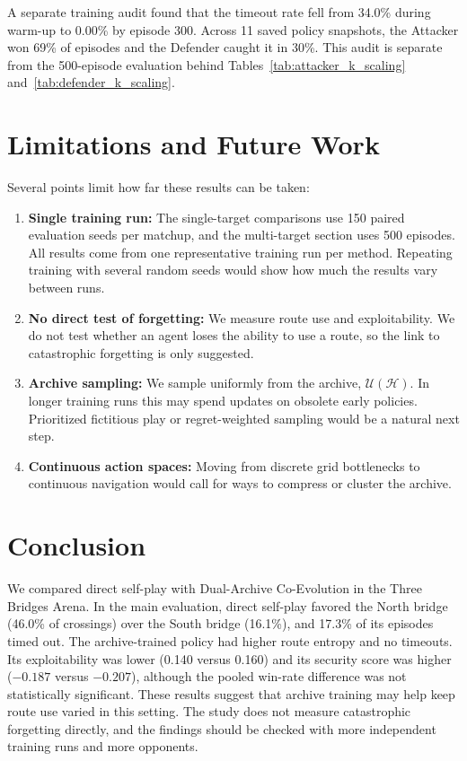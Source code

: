 \documentclass[conference]{IEEEtran}
\begin{document}
A separate training audit found that the timeout rate fell from 34.0\% during warm-up to 0.00\% by episode 300. Across 11 saved policy snapshots, the Attacker won 69\% of episodes and the Defender caught it in 30\%. This audit is separate from the 500-episode evaluation behind Tables~\ref{tab:attacker_k_scaling} and~\ref{tab:defender_k_scaling}.

\section{Limitations and Future Work}
Several points limit how far these results can be taken:
\begin{enumerate}
    \item \textbf{Single training run:} The single-target comparisons use 150 paired evaluation seeds per matchup, and the multi-target section uses 500 episodes. All results come from one representative training run per method. Repeating training with several random seeds would show how much the results vary between runs.
    \item \textbf{No direct test of forgetting:} We measure route use and exploitability. We do not test whether an agent loses the ability to use a route, so the link to catastrophic forgetting is only suggested.
    \item \textbf{Archive sampling:} We sample uniformly from the archive, $\mathcal{U}(\mathcal{H})$. In longer training runs this may spend updates on obsolete early policies. Prioritized fictitious play or regret-weighted sampling would be a natural next step.
    \item \textbf{Continuous action spaces:} Moving from discrete grid bottlenecks to continuous navigation would call for ways to compress or cluster the archive.
\end{enumerate}

\section{Conclusion}
We compared direct self-play with Dual-Archive Co-Evolution in the Three Bridges Arena. In the main evaluation, direct self-play favored the North bridge (46.0\% of crossings) over the South bridge (16.1\%), and 17.3\% of its episodes timed out. The archive-trained policy had higher route entropy and no timeouts. Its exploitability was lower (0.140 versus 0.160) and its security score was higher ($-0.187$ versus $-0.207$), although the pooled win-rate difference was not statistically significant. These results suggest that archive training may help keep route use varied in this setting. The study does not measure catastrophic forgetting directly, and the findings should be checked with more independent training runs and more opponents.
\end{document}
